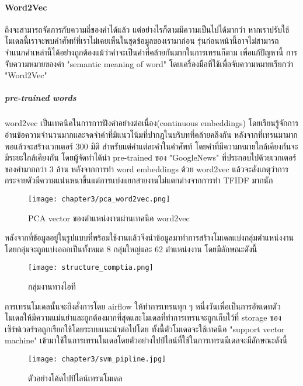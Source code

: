   \paragraph*{Word2Vec} ถึงจะสามารถจัดการกับความถี่ของคำได้แล้ว แต่อย่างไรก็ตามมีความเป็นไปได้มากว่า หากเราปรับใช้โมเดลนี้เราจะพบคำศัพท์ที่เราไม่เคยเห็นในชุดข้อมูลของเรามาก่อน รุ่นก่อนหน้านี้อาจไม่สามารถจำแนกคำเหล่านี้ได้อย่างถูกต้องแม้ว่าคำจะเป็นคำที่คล้ายกันมากในการเทรนก็ตาม เพื่อแก้ปัญหานี้ การจับความหมายของคำ "semantic meaning of word" โดยเครื่องมือที่ใช้เพื่อจับความหมายเรียกว่า "Word2Vec" \par
    \subparagraph{pre-trained words} word2vec เป็นเทคนิคในการการฝังคำอย่างต่อเนื่อง(continuous embeddings) โดยเรียนรู้จักการอ่านข้อความจำนวนมากและจดจำคำที่มีแนวโน้มที่ปากฎในบริบทที่คล้ายคลึงกัน หลังจากที่เทรนมามากพอแล้วจะสร้างเวกเตอร์ 300 มิติ สำหรับแต่คำแต่ละคำในคำศัพท์ โดยคำที่มีความหมายใกล้เคียงกันจะมีระยะใกล้เคียงกัน
    โดยผู้จัดทำได้นำ pre-trained ของ "GoogleNews" ที่ประกอบไปด้วยเวกเตอร์ของคำมากกว่า 3 ล้าน หลังจากการทำ word embeddings ด้วย word2vec แล้วจะสังเกตุว่าการกระจายตัวมีความแน่นหนาขึ้นแต่การแบ่งแยกสายงานไม่แตกต่างจากการทำ TFIDF มากนัก
    \begin{figure}[!h]
      \centering
      \texttt{[image: chapter3/pca\_word2vec.png]}  
      \caption{PCA vector ของตำแหน่งงานผ่านเทคนิค word2vec}
      \label{Fig:pca-tfidf}
    \end{figure}
  
  \newpage
  หลังจากที่ข้อมูลอยู่ในรูปแบบที่พร้อมใช้งานแล้วจึงนำข้อมูลมาทำการสร้างโมเดลแบ่งกลุ่มตำแหน่งงาน โดยกลุ่มจะถูกแบ่งออกเป็นทั้งหมด 8 กลุ่มใหญ่และ 62 ตำแหน่งงาน \cite[CompTIA]{comptia} โดยมีลักษณะดังนี้\newline

  \begin{figure}[!h]
    \centering
    \texttt{[image: structure\_comptia.png]}  
    \caption{กลุ่มงานทางไอที}
    \label{Fig:structure_comptia}
  \end{figure}

  การเทรนโมเดลนั้นจะถึงสั่งการโดย airflow ให้ทำการเทรนทุก ๆ หนึ่งวันเพื่อเป็นการอัพเดทตัวโมเดลให้มีความแม่นยำและถูกต้องมากที่สุดและโมเดลที่ทำการเทรนจะถูกเก็บไว้ที่ storage ของเซิร์ฟเวอร์รอถูกเรียกใช้โดยระบบแนะนำต่อไปโดย ทั้งนี้ตัวโมเดลจะใช้เทคนิค "support vector machine" เข้ามาใช้ในการเทรนโมเดลโดยตัวอย่างไปป์ไลน์ที่ใช้ในการเทรนมีเดลจะมีลักษณะดังนี้
  \begin{figure}[!h]
    \centering
    \texttt{[image: chapter3/svm\_pipline.jpg]}  
    \caption{ตัวอย่างโค้ดไปป์ไลน์เทรนโมเดล}
    \label{Fig:svm_pipline}
  \end{figure}


